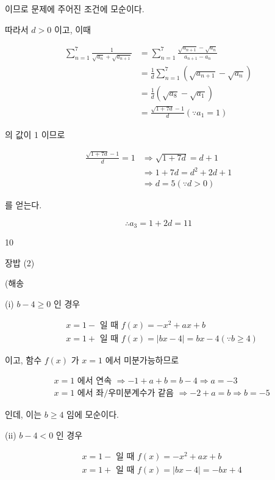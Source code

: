 \documentclass[10pt]{article}
\begin{document}
이므로 문제에 주어진 조건에 모순이다.

따라서 \(d>0\) 이고, 이때

\[
\begin{aligned}
\sum_{n=1}^{7} \frac{1}{\sqrt{a_{n}}+\sqrt{a_{n+1}}} & =\sum_{n=1}^{7} \frac{\sqrt{a_{n+1}}-\sqrt{a_{n}}}{a_{n+1}-a_{n}} \\
& =\frac{1}{d} \sum_{n=1}^{7}\left(\sqrt{a_{n+1}}-\sqrt{a_{n}}\right) \\
& =\frac{1}{d}\left(\sqrt{a_{8}}-\sqrt{a_{1}}\right) \\
& =\frac{\sqrt{1+7 d}-1}{d}\left(\because a_{1}=1\right)
\end{aligned}
\]

의 값이 1 이므로

\[
\begin{aligned}
\frac{\sqrt{1+7 d}-1}{d}=1 & \Rightarrow \sqrt{1+7 d}=d+1 \\
& \Rightarrow 1+7 d=d^{2}+2 d+1 \\
& \Rightarrow d=5(\because d>0)
\end{aligned}
\]

를 얻는다.

\[
\therefore a_{3}=1+2 d=11
\]

10

장밥 (2)

(해송

(i) \(b-4 \geq 0\) 인 경우

\[
\begin{aligned}
& x=1-\text { 일 때 } f(x)=-x^{2}+a x+b \\
& x=1+\text { 일 때 } f(x)=|b x-4|=b x-4(\because b \geq 4)
\end{aligned}
\]

이고, 함수 \(f(x)\) 가 \(x=1\) 에서 미분가능하므로

\[
\begin{aligned}
& x=1 \text { 에서 연속 } \Rightarrow-1+a+b=b-4 \Rightarrow a=-3 \\
& x=1 \text { 에서 좌/우미분계수가 같음 } \Rightarrow-2+a=b \Rightarrow b=-5
\end{aligned}
\]

인데, 이는 \(b \geq 4\) 임에 모순이다.

(ii) \(b-4<0\) 인 경우

\[
\begin{aligned}
& x=1-\text { 일 때 } f(x)=-x^{2}+a x+b \\
& x=1+\text { 일 때 } f(x)=|b x-4|=-b x+4
\end{aligned}
\]
\end{document}
